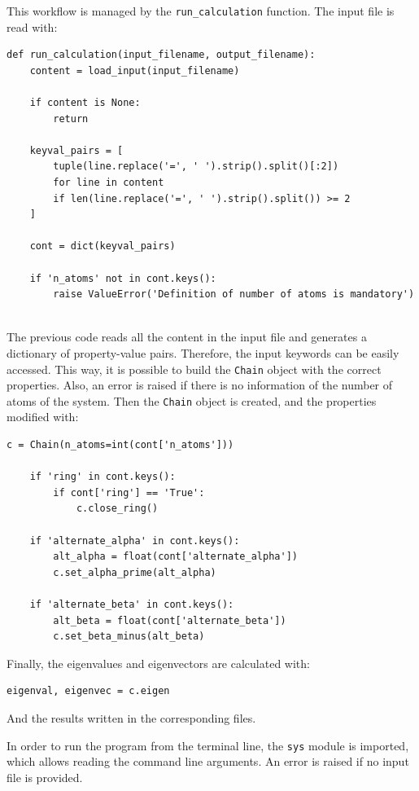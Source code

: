 \documentclass[twocolumn]{article}
\begin{document}
This workflow is managed by the \texttt{run\_calculation} function. The input file is read with:

\begin{lstlisting}[backgroundcolor=\color{LightGray}]
def run_calculation(input_filename, output_filename):
    content = load_input(input_filename)

    if content is None:
        return

    keyval_pairs = [ 
        tuple(line.replace('=', ' ').strip().split()[:2])
        for line in content 
        if len(line.replace('=', ' ').strip().split()) >= 2
    ]

    cont = dict(keyval_pairs)

    if 'n_atoms' not in cont.keys():
        raise ValueError('Definition of number of atoms is mandatory')
    
\end{lstlisting} 

The previous code reads all the content in the input file and generates a dictionary of property-value pairs. Therefore, the input keywords can be easily accessed. This way, it is possible to build the \texttt{Chain} object with the correct properties. Also, an error is raised if there is no information of the number of atoms of the system. Then the \texttt{Chain} object is created, and the properties modified with:

\begin{lstlisting}[backgroundcolor=\color{LightGray}]
    c = Chain(n_atoms=int(cont['n_atoms']))

    if 'ring' in cont.keys():
        if cont['ring'] == 'True':
            c.close_ring()

    if 'alternate_alpha' in cont.keys():
        alt_alpha = float(cont['alternate_alpha'])
        c.set_alpha_prime(alt_alpha)

    if 'alternate_beta' in cont.keys():
        alt_beta = float(cont['alternate_beta'])
        c.set_beta_minus(alt_beta)
\end{lstlisting} 

Finally, the eigenvalues and eigenvectors are calculated with:
\begin{lstlisting}[backgroundcolor=\color{LightGray}]
        eigenval, eigenvec = c.eigen    
\end{lstlisting} 

And the results written in the corresponding files.

In order to run the program from the terminal line, the \texttt{sys} module is imported, which allows reading the command line arguments. An error is raised if no input file is provided. 
\end{document}
